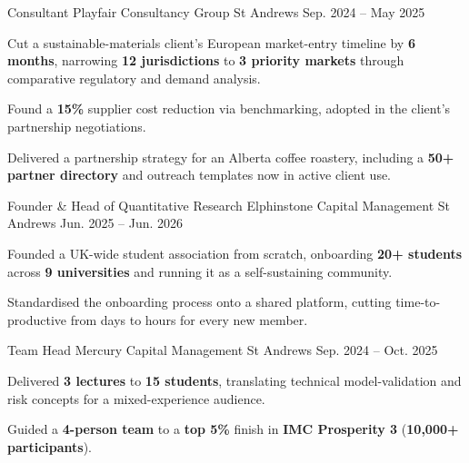 \begin{cventries}
  \cventry
    {Consultant} %
    {Playfair Consultancy Group} %
    {St Andrews} %
    {Sep. 2024 -- May 2025} %
    {
      \begin{cvitems}
        \item {Cut a sustainable-materials client's European market-entry timeline by \textbf{6 months}, narrowing \textbf{12 jurisdictions} to \textbf{3 priority markets} through comparative regulatory and demand analysis.}
        \item {Found a \textbf{15\%} supplier cost reduction via benchmarking, adopted in the client's partnership negotiations.}
        \item {Delivered a partnership strategy for an Alberta coffee roastery, including a \textbf{50+ partner directory} and outreach templates now in active client use.}
      \end{cvitems}
    }

  \cventry
    {Founder \& Head of Quantitative Research} %
    {Elphinstone Capital Management} %
    {St Andrews} %
    {Jun. 2025 -- Jun. 2026} %
    {
      \begin{cvitems}
        \item {Founded a UK-wide student association from scratch, onboarding \textbf{20+ students} across \textbf{9 universities} and running it as a self-sustaining community.}
        \item {Standardised the onboarding process onto a shared platform, cutting time-to-productive from days to hours for every new member.}
      \end{cvitems}
    }

  \cventry
    {Team Head} %
    {Mercury Capital Management} %
    {St Andrews} %
    {Sep. 2024 -- Oct. 2025} %
    {
      \begin{cvitems}
        \item {Delivered \textbf{3 lectures} to \textbf{15 students}, translating technical model-validation and risk concepts for a mixed-experience audience.}
        \item {Guided a \textbf{4-person team} to a \textbf{top 5\%} finish in \textbf{IMC Prosperity 3} (\textbf{10,000+ participants}).}
      \end{cvitems}
    }

\end{cventries}
